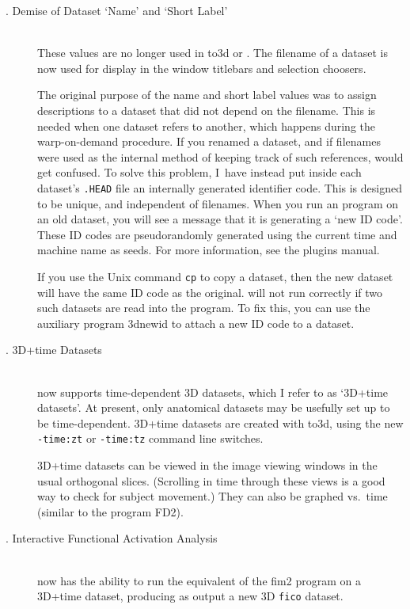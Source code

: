 \begin{description}
  \item[. Demise of Dataset `Name' and `Short Label'] \blob\\
    These values are no longer used in {\sf to3d} or \afni.
    The filename of a dataset is now used for display in the \afnit window
    titlebars and selection choosers.

    The original purpose of the name and short label values was
    to assign descriptions to a dataset that did not depend on the
    filename.  This is needed when one dataset refers to another,
    which happens during the warp-on-demand procedure.
    If you renamed a dataset, and if filenames
    were used as the internal method of keeping track of such references,
    \afnit would get confused.  To solve this problem, I~have instead
    put inside each dataset's {\tt .HEAD} file an internally generated
    identifier code.  This is designed to be unique, and independent
    of filenames.  When you run an \afnit program on an old dataset,
    you will see a message that it is generating a `new ID code'.
    These ID codes are pseudorandomly generated using the current time and
    machine name as seeds.  For more information, see the plugins manual.

    If you use the Unix command {\tt cp} to copy a dataset, then
    the new dataset will have the same ID code as the original.
    \afnit will not run correctly if two such datasets are read
    into the program.  To fix this, you can use the auxiliary
    program {\sf 3dnewid} to attach a new ID code to a dataset.

  \item[. 3D+time Datasets] \blob\\
    \afnit now supports time-dependent 3D datasets,
    which I refer to as `3D+time datasets'.  At present, only
    anatomical datasets may be usefully set up to be time-dependent.
    3D+time datasets are created with {\sf to3d}, using the
    new {\tt -time:zt} or {\tt -time:tz} command line switches.

    3D+time datasets can be viewed in the image viewing windows in
    the usual orthogonal slices. (Scrolling in time
    through these views is a good way to check for subject movement.)
    They can also be graphed vs.\ time (similar to the program {\sf FD2}).

  \item[. Interactive Functional Activation Analysis] \blob\\
    \afnit now has the ability to run the equivalent of the
    {\sf fim2} program on a 3D+time dataset, producing as output
    a new 3D {\tt fico} dataset.


\end{description}
